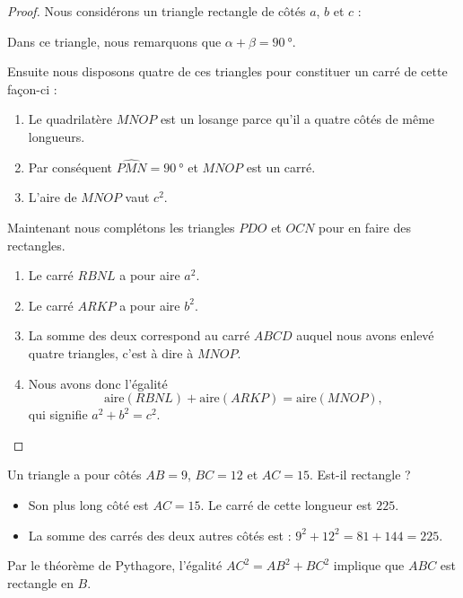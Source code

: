 \begin{proof}

    Nous considérons un triangle rectangle de côtés \( a\), \( b\) et \( c\) :
\begin{center}
   
\end{center}

Dans ce triangle, nous remarquons que \( \alpha+\beta=\SI{90}{\degree}\).

Ensuite nous disposons quatre de ces triangles pour constituer un carré de cette façon-ci :
\begin{center}
   
\end{center}


\begin{enumerate}
    \item
        Le quadrilatère \( MNOP\) est un losange parce qu'il a quatre côtés de même longueurs.
    \item
        Par conséquent \( \widehat{PMN}=\SI{90}{\degree}\) et \( MNOP\) est un carré.
    \item
        L'aire de \( MNOP\) vaut \( c^2\).
\end{enumerate}

Maintenant nous complétons les triangles \( PDO\) et \( OCN\) pour en faire des rectangles.

\begin{center}
   
\end{center}

\begin{enumerate}
    \item
        Le carré \( RBNL\) a pour aire \( a^2\).
    \item
        Le carré \( ARKP\) a pour aire \( b^2\).
    \item
        La somme des deux correspond au carré \( ABCD\) auquel nous avons enlevé quatre triangles, c'est à dire à \( MNOP\).
    \item
        Nous avons donc l'égalité
        \begin{equation}
            \text{aire}(RBNL)+\text{aire}(ARKP)=\text{aire}(MNOP),
        \end{equation}
        qui signifie \( a^2+b^2=c^2\).
\end{enumerate}

\end{proof}

\begin{example}
    Un triangle a pour côtés \( AB=9\), \( BC=12\) et \( AC=15\). Est-il rectangle ?
    \begin{itemize}
        \item Son plus long côté est \( AC=15\). Le carré de cette longueur est \( 225\).
        \item La somme des carrés des deux autres côtés est : \( 9^2+12^2=81+144=225\).
    \end{itemize}
    Par le théorème de Pythagore, l'égalité \( AC^2=AB^2+BC^2\) implique que \( ABC\) est rectangle en \( B\).
\end{example}

